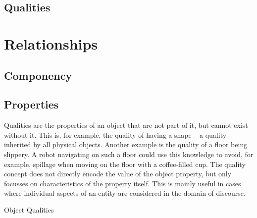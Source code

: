 \subsection{Qualities}

\section{Relationships}
\label{sec:background:relations}
\subsection{Componency}

\subsection{Properties}
\label{sec:qualification}

Qualities are the properties of an object that are not part of it, but cannot exist without it.
This is, for example, the quality of having a shape -- a quality inherited by all physical objects.
Another example is the quality of a floor being slippery.
A robot navigating on such a floor could use this knowledge to avoid, for example,
spillage when moving on the floor with a coffee-filled cup.
The quality concept does not directly encode the value of the object property, but only focusses on characteristics of the property itself.
This is mainly useful in cases where individual aspects of an entity are considered in the domain of discourse.

\begin{ODP}{Object Qualities}
\end{ODP}

